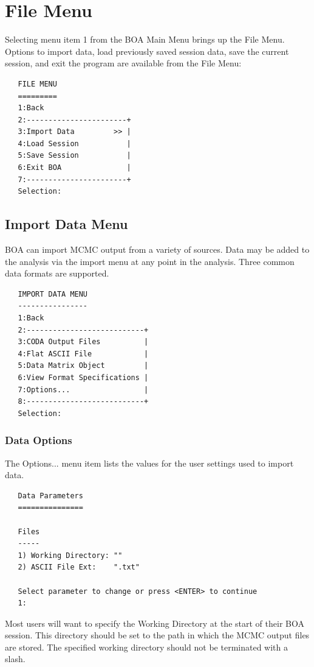 \documentclass[12pt,letterpaper]{report}
\begin{document}
\chapter{File Menu}
\noindent
Selecting menu item 1 from the BOA Main Menu brings up the File Menu. Options to
import data, load previously saved session data, save the current session, and
exit the program are available from the File Menu:
\vskip 9pt
\begin{tiny}
\begin{verbatim}
   FILE MENU
   =========
   1:Back
   2:-----------------------+
   3:Import Data         >> |
   4:Load Session           |
   5:Save Session           |
   6:Exit BOA               |
   7:-----------------------+
   Selection:
\end{verbatim}
\end{tiny}

\section{Import Data Menu}
\noindent BOA can import MCMC output from a variety of sources.
Data may be added to the analysis via the import menu at any point
in the analysis.  Three common data formats are supported.
\vskip
9pt
\begin{tiny}
\begin{verbatim}
   IMPORT DATA MENU
   ----------------
   1:Back
   2:---------------------------+
   3:CODA Output Files          |
   4:Flat ASCII File            |
   5:Data Matrix Object         |
   6:View Format Specifications |
   7:Options...                 |
   8:---------------------------+
   Selection:
\end{verbatim}
\end{tiny}

\subsection{Data Options}
\label{ssec.datapar}
\noindent
The Options... menu item lists the values for the user settings used to import
data.
\vskip 9pt
\begin{tiny}
\begin{verbatim}
   Data Parameters
   ===============

   Files
   -----
   1) Working Directory: ""
   2) ASCII File Ext:    ".txt"

   Select parameter to change or press <ENTER> to continue
   1:
\end{verbatim}
\end{tiny}
Most users will want to specify the Working Directory at the start
of their BOA session. This directory should be set to the path in
which the MCMC output files are stored.  The specified working
directory should not be terminated with a slash.
\end{document}
